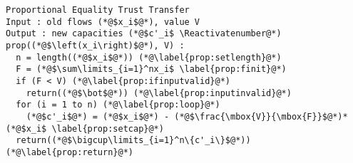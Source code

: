 {}
\Suppressnumber
\begin{lstlisting}[label=prop, style=numbers]
Proportional Equality Trust Transfer
Input : old flows (*@$x_i$@*), value V
Output : new capacities (*@$c'_i$ \Reactivatenumber@*)
prop((*@$\left(x_i\right)$@*), V) :
  n = length((*@$x_i$@*)) (*@\label{prop:setlength}@*)
  F = (*@$\sum\limits_{i=1}^nx_i$ \label{prop:finit}@*)
  if (F < V) (*@\label{prop:ifinputvalid}@*)
    return((*@$\bot$@*)) (*@\label{prop:inputinvalid}@*)
  for (i = 1 to n) (*@\label{prop:loop}@*)
    (*@$c'_i$@*) = (*@$x_i$@*) - (*@$\frac{\mbox{V}}{\mbox{F}}$@*)*(*@$x_i$ \label{prop:setcap}@*)
  return((*@$\bigcup\limits_{i=1}^n\{c'_i\}$@*)) (*@\label{prop:return}@*)
\end{lstlisting}
